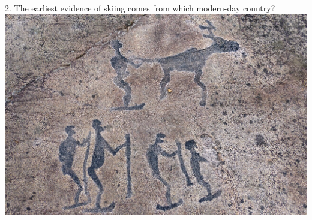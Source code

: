 \begin{frame}
\begin{center}
\Large
2. The earliest evidence of skiing comes from which modern-day country?
\\
\vspace{0.5em}\includegraphics[height=0.6\paperheight]{images/skiing.jpg}
\\
\end{center}
\end{frame}
